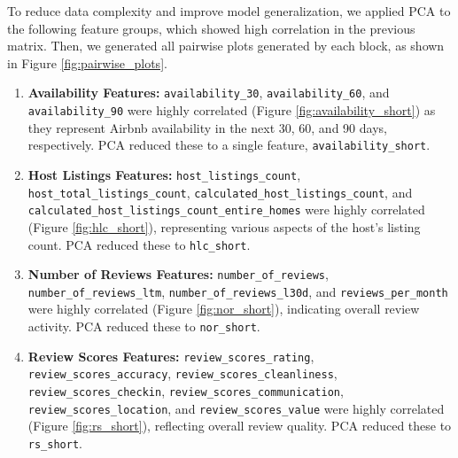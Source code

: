 \documentclass[12pt]{article}
\begin{document}
To reduce data complexity and improve model generalization, we applied PCA to the following feature groups, which showed high correlation in the previous matrix. Then, we generated all pairwise plots generated by each block, as shown in Figure \ref{fig:pairwise_plots}.

\begin{enumerate}
    \item \textbf{Availability Features:} \texttt{availability\_30}, \texttt{availability\_60}, and \texttt{availability\_90} were highly correlated (Figure \ref{fig:availability_short}) as they represent Airbnb availability in the next 30, 60, and 90 days, respectively. PCA reduced these to a single feature, \texttt{availability\_short}.
    
    \item \textbf{Host Listings Features:} \texttt{host\_listings\_count}, \texttt{host\_total\_listings\_count}, \texttt{calculated\_host\_listings\_count}, and \texttt{calculated\_host\_listings\_count\_entire\_homes} were highly correlated (Figure \ref{fig:hlc_short}), representing various aspects of the host's listing count. PCA reduced these to \texttt{hlc\_short}.
    
    \item \textbf{Number of Reviews Features:} \texttt{number\_of\_reviews}, \texttt{number\_of\_reviews\_ltm}, \texttt{number\_of\_reviews\_l30d}, and \texttt{reviews\_per\_month} were highly correlated (Figure \ref{fig:nor_short}), indicating overall review activity. PCA reduced these to \texttt{nor\_short}.
    
    \item \textbf{Review Scores Features:} \texttt{review\_scores\_rating}, \texttt{review\_scores\_accuracy}, \texttt{review\_scores\_cleanliness}, \texttt{review\_scores\_checkin}, \texttt{review\_scores\_communication}, \texttt{review\_scores\_location}, and \texttt{review\_scores\_value} were highly correlated (Figure \ref{fig:rs_short}), reflecting overall review quality. PCA reduced these to \texttt{rs\_short}.
\end{enumerate}
\end{document}
